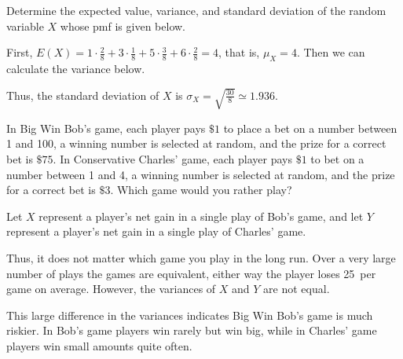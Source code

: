 \begin{examp} Determine the expected value, variance, and standard deviation of the random variable $X$ whose pmf is given below.
\renewcommand*{\arraystretch}{1.35}
\renewcommand*{\arraystretch}{1}
\par
\noindent First, $E(X) = 1 \cdot \frac{2}{8} + 3 \cdot \frac{1}{8} + 5 \cdot \frac{3}{8} + 6 \cdot \frac{2}{8} = 4$, that is, $\mu_X = 4$. Then we can calculate the variance below.
\par
\noindent Thus, the standard deviation of $X$ is $\sigma_X = \sqrt{\frac{30}{8}} \simeq 1.936$.
\end{examp}

\begin{examp} In Big Win Bob's game, each player pays $\$1$ to place a bet on a number between 1 and 100, a winning number is selected at random, and the prize for a correct bet is $\$75$. In Conservative Charles' game, each player pays $\$1$ to bet on a number between 1 and 4, a winning number is selected at random, and the prize for a correct bet is $\$3$. Which game would you rather play?
\par
\noindent Let $X$ represent a player's net gain in a single play of Bob's game, and let $Y$ represent a player's net gain in a single play of Charles' game.
\par
\noindent Thus, it does not matter which game you play in the long run. Over a very large number of plays the games are equivalent, either way the player loses 25\textcent\ per game on average. However, the variances of $X$ and $Y$ are not equal.
\par
\noindent This large difference in the variances indicates Big Win Bob's game is much riskier. In Bob's game players win rarely but win big, while in Charles' game players win small amounts quite often.

\end{examp}

